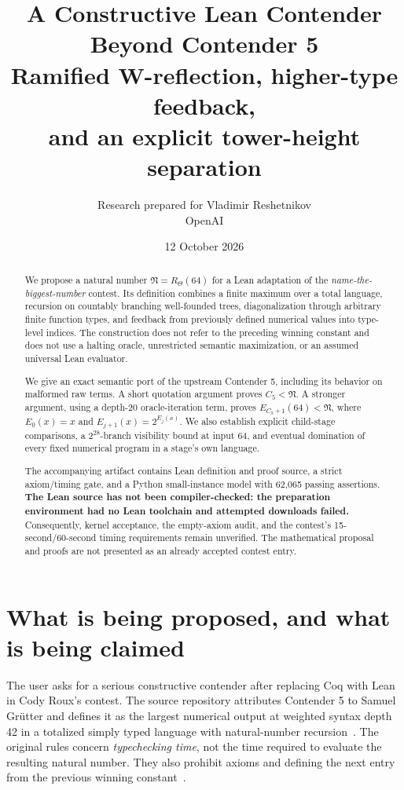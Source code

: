 \documentclass[11pt]{article}
\title{A Constructive Lean Contender\texorpdfstring{\\}{ }Beyond Contender 5\\[7pt]
\large Ramified W-reflection, higher-type feedback,\\and an explicit tower-height separation}
\author{Research prepared for Vladimir Reshetnikov\\\small OpenAI}
\date{12 October 2026}
\theoremstyle{definition}
\newcommand{\Entry}{\mathfrak N}
\newcommand{\Cfive}{C_5}
\begin{document}
\maketitle
\begin{abstract}
We propose a natural number $\Entry=R_\Theta(64)$ for a Lean adaptation of the
\emph{name-the-biggest-number} contest. Its definition combines a finite
maximum over a total language, recursion on countably branching well-founded
trees, diagonalization through arbitrary finite function types, and feedback
from previously defined numerical values into type-level indices. The
construction does not refer to the preceding winning constant and does not use
a halting oracle, unrestricted semantic maximization, or an assumed universal
Lean evaluator.

We give an exact semantic port of the upstream Contender 5, including its
behavior on malformed raw terms. A short quotation argument proves
$\Cfive<\Entry$. A stronger argument, using a depth-20 oracle-iteration term,
proves $E_{\Cfive+1}(64)<\Entry$, where $E_0(x)=x$ and
$E_{j+1}(x)=2^{E_j(x)}$. We also establish explicit child-stage comparisons,
a $2^{28}$-branch visibility bound at input 64, and eventual domination of
every fixed numerical program in a stage's own language.

The accompanying artifact contains Lean definition and proof source, a
strict axiom/timing gate, and a Python small-instance model with 62,065 passing
assertions. \textbf{The Lean source has not been compiler-checked: the
preparation environment had no Lean toolchain and attempted downloads failed.}
Consequently, kernel acceptance, the empty-axiom audit, and the contest's
15-second/60-second timing requirements remain unverified. The mathematical
proposal and proofs are not presented as an already accepted contest entry.
\end{abstract}

\clearpage
\setcounter{tocdepth}{1}
\tableofcontents
\clearpage

\section{What is being proposed, and what is being claimed}

The user asks for a serious constructive contender after replacing Coq with
Lean in Cody Roux's contest. The source repository attributes Contender 5 to
Samuel Gr\"utter and defines it as the largest numerical output at weighted
syntax depth 42 in a totalized simply typed language with natural-number
recursion~\cite{repo,contender}. The original rules concern \emph{typechecking
time}, not the time required to evaluate the resulting natural number.
They also prohibit axioms and defining the next entry from the previous
winning constant~\cite{rules}.
\end{document}
